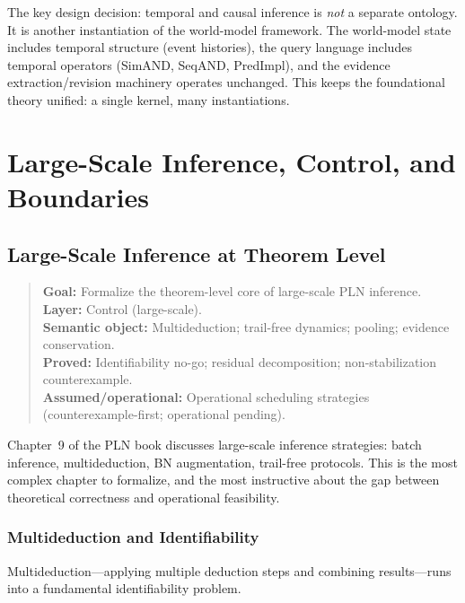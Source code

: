 \documentclass[11pt,openany]{report}
\begin{document}
The key design decision: temporal and causal inference is \emph{not} a
separate ontology.  It is another instantiation of the world-model
framework.  The world-model state includes temporal structure (event
histories), the query language includes temporal operators (SimAND,
SeqAND, PredImpl), and the evidence extraction/revision machinery
operates unchanged.  This keeps the foundational theory unified:
a single kernel, many instantiations.


\part{Large-Scale Inference, Control, and Boundaries}
\label{part:large-scale}

\chapter{Large-Scale Inference at Theorem Level}
\label{ch:large-scale}

\begin{quote}\small
\textbf{Goal:} Formalize the theorem-level core of large-scale PLN inference.\\
\textbf{Layer:} Control (large-scale).\\
\textbf{Semantic object:} Multideduction; trail-free dynamics; pooling; evidence conservation.\\
\textbf{Proved:} Identifiability no-go; residual decomposition; non-stabilization counterexample.\\
\textbf{Assumed/operational:} Operational scheduling strategies (counterexample-first; operational pending).
\end{quote}

Chapter~9 of the PLN book discusses large-scale inference strategies:
batch inference, multideduction, BN augmentation, trail-free protocols.
This is the most complex chapter to formalize, and the most instructive
about the gap between theoretical correctness and operational feasibility.

\section{Multideduction and Identifiability}

Multideduction---applying multiple deduction steps and combining
results---runs into a fundamental identifiability problem.
\end{document}
